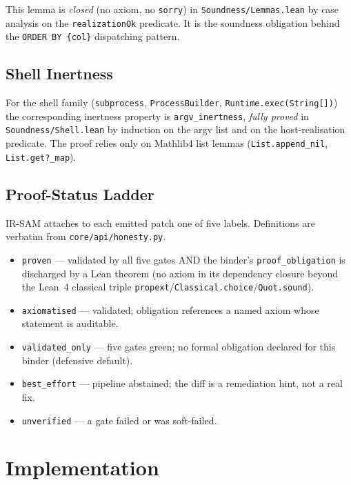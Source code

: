 \documentclass[conference]{IEEEtran}
\newcommand{\IRSAM}{\textsc{IR-SAM}}
\begin{document}
This lemma is \emph{closed} (no axiom, no \texttt{sorry}) in
\texttt{Soundness/Lemmas.lean} by case analysis on the
\texttt{realizationOk} predicate. It is the soundness obligation
behind the \texttt{ORDER BY \{col\}} dispatching pattern.

\subsection{Shell Inertness}
For the shell family (\texttt{subprocess}, \texttt{ProcessBuilder},
\texttt{Runtime.exec(String[])}) the corresponding inertness
property is \texttt{argv\_inertness}, \emph{fully proved} in
\texttt{Soundness/Shell.lean} by induction on the argv list and on
the host-realisation predicate. The proof relies only on Mathlib4
list lemmas (\texttt{List.append\_nil}, \texttt{List.get?\_map}).

\subsection{Proof-Status Ladder}\label{sec:honesty}

\IRSAM{} attaches to each emitted patch one of five labels.
Definitions are verbatim from
\texttt{core/api/honesty.py}.

\begin{itemize}[leftmargin=*]
\item \texttt{proven} --- validated by all five gates AND the
  binder's \texttt{proof\_obligation} is discharged by a Lean
  theorem (no axiom in its dependency closure beyond the
  Lean~4 classical triple
  \texttt{propext}/\texttt{Classical.choice}/\texttt{Quot.sound}).
\item \texttt{axiomatised} --- validated; obligation references a
  named axiom whose statement is auditable.
\item \texttt{validated\_only} --- five gates green; no formal
  obligation declared for this binder (defensive default).
\item \texttt{best\_effort} --- pipeline abstained; the diff is a
  remediation hint, not a real fix.
\item \texttt{unverified} --- a gate failed or was soft-failed.
\end{itemize}

\section{Implementation}\label{sec:impl}
\end{document}
